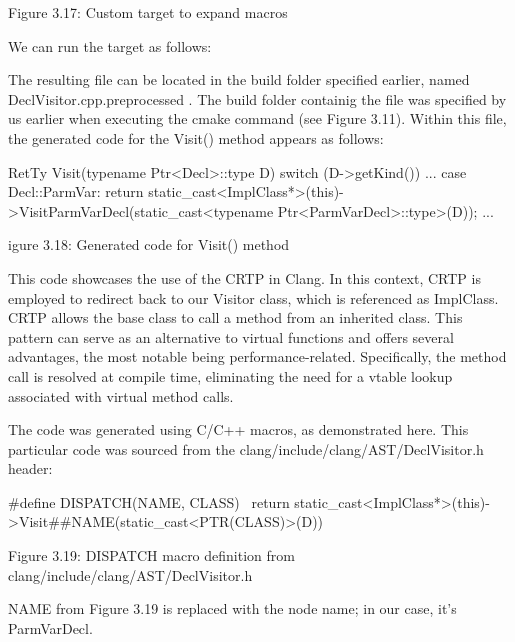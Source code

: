 \begin{center}
Figure 3.17: Custom target to expand macros
\end{center}

We can run the target as follows:


The resulting file can be located in the build folder specified earlier, named DeclVisitor.cpp.preprocessed . The build folder containig the file was specified by us earlier when executing the cmake command (see Figure 3.11). Within this file, the generated code for the Visit() method appears as follows:

\begin{cpp}
RetTy Visit(typename Ptr<Decl>::type D) {
  switch (D->getKind()) {
  ...
  case Decl::ParmVar: return static_cast<ImplClass*>(this)->VisitParmVarDecl(static_cast<typename Ptr<ParmVarDecl>::type>(D));
  ...
  }
}
\end{cpp}

\begin{center}
igure 3.18: Generated code for Visit() method
\end{center}

This code showcases the use of the CRTP in Clang. In this context, CRTP is employed to redirect back to our Visitor class, which is referenced as ImplClass. CRTP allows the base class to call a method from an inherited class. This pattern can serve as an alternative to virtual functions and offers several advantages, the most notable being performance-related. Specifically, the method call is resolved at compile time, eliminating the need for a vtable lookup associated with virtual method calls.

The code was generated using C/C++ macros, as demonstrated here. This particular code was sourced from the clang/include/clang/AST/DeclVisitor.h header:

\begin{cpp}
#define DISPATCH(NAME, CLASS) \
  return static_cast<ImplClass*>(this)->Visit##NAME(static_cast<PTR(CLASS)>(D))
\end{cpp}

\begin{center}
Figure 3.19: DISPATCH macro definition from clang/include/clang/AST/DeclVisitor.h
\end{center}

NAME from Figure 3.19 is replaced with the node name; in our case, it’s ParmVarDecl.

